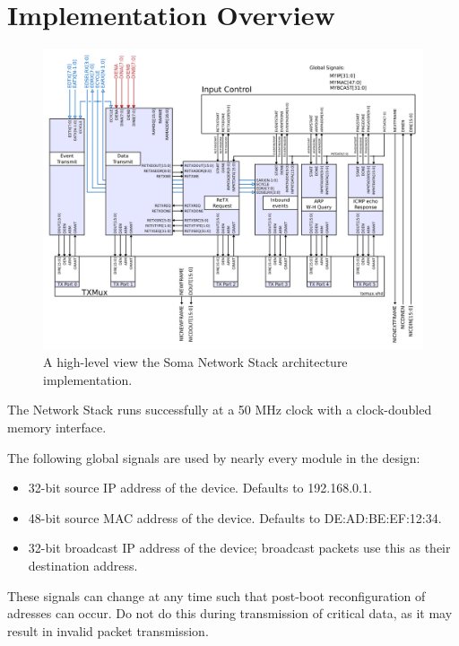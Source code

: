 \section{Implementation Overview}

\begin{figure}
\begin{centering}
\includegraphics[scale=0.6]{overview.svg}
\end{centering}
\caption{A high-level view the Soma Network Stack architecture implementation.}
\label{overview}
\end{figure}

The Network Stack runs successfully at a 50 MHz clock with a
clock-doubled memory interface. 

The following global signals are used by nearly every module in the design: 

\begin{itemize}
\item {} 32-bit source IP address of the device. Defaults to 192.168.0.1. 
\item {} 48-bit source MAC address of the device. Defaults to DE:AD:BE:EF:12:34. 
\item {} 32-bit broadcast IP address of the device; broadcast packets use this as their destination address. 
\end{itemize}

These signals can change at any time such that post-boot
reconfiguration of adresses can occur. Do not do this during
transmission of critical data, as it may result in invalid packet
transmission.

